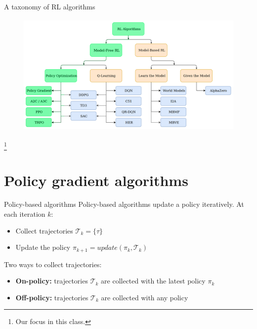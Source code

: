 \documentclass[11pt, aspectratio=169]{beamer}
\newcommand\blfootnote[1]{%
  \begingroup
  \renewcommand\thefootnote{}%
  \footnote{#1}%
  \addtocounter{footnote}{-1}%
  \endgroup
}
\begin{document}
\begin{frame}{A taxonomy of RL algorithms}
    \begin{figure}
        \includegraphics[height=6cm]{figures/taxonomy-focus.png}
    \end{figure}
    \blfootnote{
        Our focus in this class.
    }
\end{frame}

\section{Policy gradient algorithms}

\begin{frame}{Policy-based algorithms}
    Policy-based algorithms update a policy iteratively. At each iteration $k$:
    \begin{itemize}
        \item Collect trajectories $\mathcal{T}_k = \{ \tau \}$
        \item Update the policy $\pi_{k+1} = \mathit{update}(\pi_k, \mathcal{T}_k)$
    \end{itemize}
    Two ways to collect trajectories:
    \begin{itemize}
        \item \textbf{On-policy:} trajectories $\mathcal{T}_k$ are collected with the latest policy $\pi_k$
        \item \textbf{Off-policy:} trajectories $\mathcal{T}_k$ are collected with any policy
    \end{itemize}
\end{frame}
\end{document}
